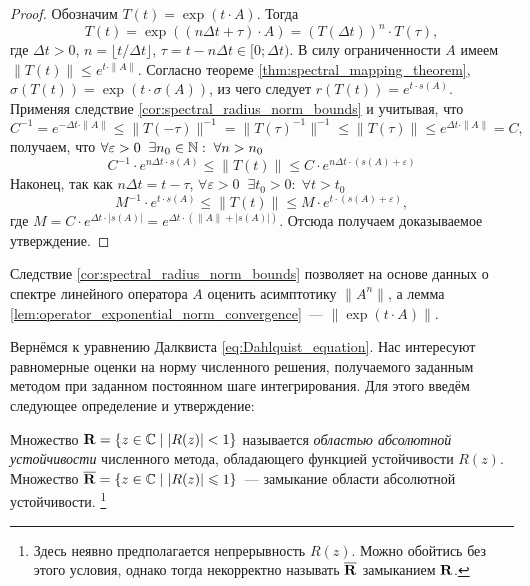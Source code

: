 \begin{proof}
    Обозначим $ T(t) = \exp(t \cdot A) $.
    Тогда
    \[
        T(t) = \exp((n \Delta t + \tau) \cdot A) = \left( T(\Delta t) \right)^n \cdot T(\tau),
    \]
    где $ \Delta t > 0 $, $ n = \lfloor t / \Delta t \rfloor $, $ \tau = t - n \Delta t \in [0;\Delta t) $.
    В силу ограниченности $ A $ имеем $ \| T(t) \| \leqslant e^{t \cdot \| A \|} $.
    Согласно теореме \ref{thm:spectral_mapping_theorem}, $ \sigma(T(t)) = \exp(t \cdot \sigma(A)) $, из чего следует $ r(T(t)) = e^{t \cdot s(A)} $.
    Применяя следствие \ref{cor:spectral_radius_norm_bounds} и учитывая, что
    \[
        C^{-1} = e^{-\Delta t \cdot \| A \|} \leqslant \| T(-\tau) \|^{-1} = \| T(\tau)^{-1} \|^{-1} \leqslant \| T(\tau) \| \leqslant e^{\Delta t \cdot \| A \|} = C,
    \]
    получаем, что $ \forall \varepsilon > 0 \;\; \exists n_0 \in \mathbb{N}: \; \forall n > n_0 $
    \[
        C^{-1} \cdot e^{n \Delta t \cdot s(A)} \leqslant \| T(t) \| \leqslant C \cdot e^{n \Delta t \cdot (s(A) + \varepsilon)}
    \]
    Наконец, так как $ n \Delta t = t - \tau $, $ \forall \varepsilon > 0 \;\; \exists t_0 > 0: \; \forall t > t_0 $
    \[
        M^{-1} \cdot e^{t \cdot s(A)} \leqslant \| T(t) \| \leqslant M \cdot e^{t \cdot (s(A) + \varepsilon)},
    \]
    где $ M = C \cdot e^{\Delta t \cdot |s(A)|} = e^{\Delta t \cdot (\|A\| + |s(A)|)} $. %
    Отсюда получаем доказываемое утверждение.
\end{proof}

Следствие \ref{cor:spectral_radius_norm_bounds} позволяет на основе данных о спектре линейного оператора $ A $ оценить асимптотику $ \| A^n \| $,
а лемма \ref{lem:operator_exponential_norm_convergence}~--- $ \| \exp(t \cdot A) \| $.

Вернёмся к уравнению Далквиста \eqref{eq:Dahlquist_equation}.
Нас интересуют равномерные оценки на норму численного решения, получаемого заданным методом при заданном постоянном шаге интегрирования.
Для этого введём следующее определение и утверждение:

\begin{definition}
    \label{def:stability_region}
    Множество $ \mathbf{R} = \{ z \in \mathbb{C} \mid | R(z) | < 1 \} $ называется \emph{областью абсолютной устойчивости} численного метода, обладающего функцией устойчивости $ R(z) $.
    Множество $ \overline{\mathbf{R}} = \{ z \in \mathbb{C} \mid | R(z) | \leqslant 1 \} $~--- замыкание области абсолютной устойчивости.%
    \footnote{Здесь неявно предполагается непрерывность $ R(z) $.
    Можно обойтись без этого условия, однако тогда некорректно называть $ \overline{\mathbf{R}} $ замыканием $ \mathbf{R} $.}
\end{definition}

